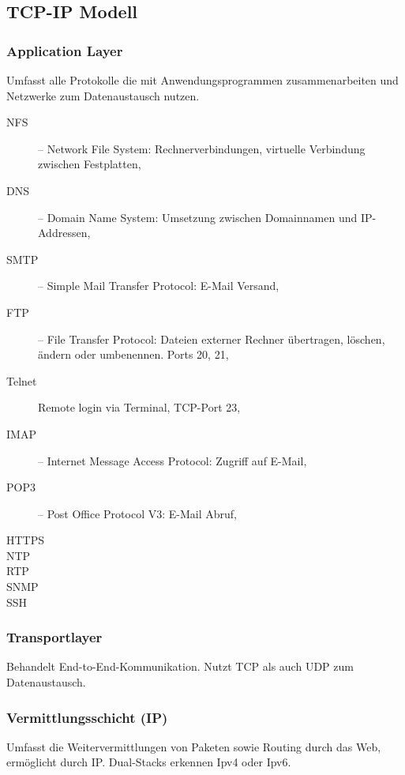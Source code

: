 \documentclass{scrartcl}
\begin{document}
    \subsection{TCP-IP Modell}
    \subsubsection{Application Layer}
    \label{subsubsection:TCP_application_layer}
    Umfasst alle Protokolle die mit Anwendungsprogrammen zusammenarbeiten und Netzwerke zum Datenaustausch nutzen.
    \begin{description}
        \item [NFS] -- Network File System: Rechnerverbindungen, virtuelle Verbindung zwischen Festplatten,
        \item [DNS] -- Domain Name System: Umsetzung zwischen Domainnamen und IP-Addressen,
        \item [SMTP] -- Simple Mail Transfer Protocol: E-Mail Versand,
        \item [FTP] -- File Transfer Protocol: Dateien externer Rechner übertragen, löschen, ändern oder umbenennen. Ports 20, 21,
        \item [Telnet] Remote login via Terminal, TCP-Port 23,
        \item [IMAP] -- Internet Message Access Protocol: Zugriff auf E-Mail,
        \item [POP3] -- Post Office Protocol V3: E-Mail Abruf,
        \item [HTTPS]
        \item [NTP]
        \item [RTP]
        \item [SNMP]
        \item [SSH]
    \end{description}
    
    \subsubsection{Transportlayer}
    \label{subsubsection:TCP_transport_layer}
    Behandelt End-to-End-Kommunikation. Nutzt TCP als auch UDP zum Datenaustausch. 
    
    \subsubsection{Vermittlungsschicht (IP)}
    Umfasst die Weitervermittlungen von Paketen sowie Routing durch das Web, ermöglicht durch IP. Dual-Stacks erkennen Ipv4 oder Ipv6.
\end{document}
